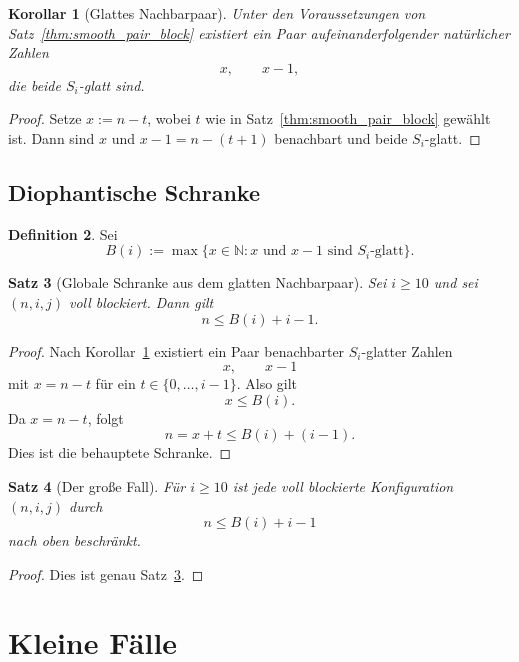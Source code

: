 \documentclass[12pt,a4paper]{article}
\theoremstyle{plain}
\newtheorem{theorem}{Satz}[section]
\newtheorem{corollary}[theorem]{Korollar}
\theoremstyle{definition}
\newtheorem{definition}[theorem]{Definition}
\theoremstyle{remark}
\begin{document}
	\begin{corollary}[Glattes Nachbarpaar]
		\label{cor:smooth_pair_xy}
		Unter den Voraussetzungen von Satz~\ref{thm:smooth_pair_block} existiert ein Paar
		aufeinanderfolgender natürlicher Zahlen
		\[
		x,\qquad x-1,
		\]
		die beide \(S_i\)-glatt sind.
	\end{corollary}
	
	\begin{proof}
		Setze \(x:=n-t\), wobei \(t\) wie in Satz~\ref{thm:smooth_pair_block} gewählt ist.
		Dann sind \(x\) und \(x-1=n-(t+1)\) benachbart und beide \(S_i\)-glatt.
	\end{proof}
	
	\subsection{Diophantische Schranke}
	
	\begin{definition}
		Sei
		\[
		B(i):=\max\{x\in\mathbb N : x \text{ und } x-1 \text{ sind } S_i\text{-glatt}\}.
		\]
	\end{definition}
	
	\begin{theorem}[Globale Schranke aus dem glatten Nachbarpaar]
		\label{thm:global_bound_from_smooth_pair}
		Sei \(i\ge10\) und sei \((n,i,j)\) voll blockiert. Dann gilt
		\[
		n\le B(i)+i-1.
		\]
	\end{theorem}
	
	\begin{proof}
		Nach Korollar~\ref{cor:smooth_pair_xy} existiert ein Paar benachbarter \(S_i\)-glatter Zahlen
		\[
		x,\qquad x-1
		\]
		mit \(x=n-t\) für ein \(t\in\{0,\dots,i-1\}\). Also gilt
		\[
		x\le B(i).
		\]
		Da \(x=n-t\), folgt
		\[
		n=x+t\le B(i)+(i-1).
		\]
		Dies ist die behauptete Schranke.
	\end{proof}
	
	\begin{theorem}[Der große Fall]
		\label{thm:large_i_case}
		Für \(i\ge10\) ist jede voll blockierte Konfiguration \((n,i,j)\) durch
		\[
		n\le B(i)+i-1
		\]
		nach oben beschränkt.
	\end{theorem}
	
	\begin{proof}
		Dies ist genau Satz~\ref{thm:global_bound_from_smooth_pair}.
	\end{proof}
	
	\section{Kleine Fälle}
	
\end{document}
